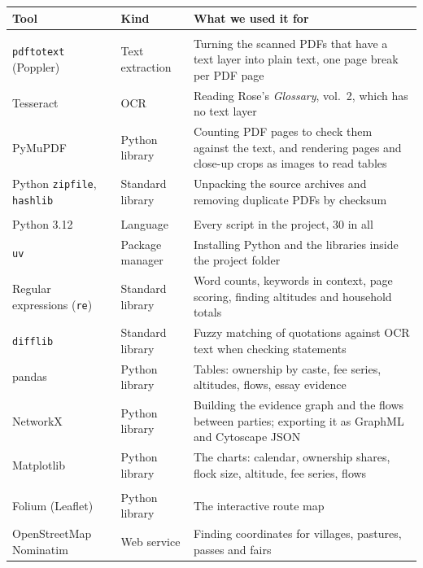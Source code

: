 \documentclass[10pt,a4paper,twocolumn]{article}
\renewcommand{\arraystretch}{1.18}
\begin{document}
{\small
\renewcommand{\arraystretch}{1.22}
\begin{tabularx}{\textwidth}{@{}>{\raggedright\arraybackslash}p{3.6cm}>{\raggedright\arraybackslash}p{2.8cm}>{\raggedright\arraybackslash}X@{}}
\toprule
\textbf{Tool} & \textbf{Kind} & \textbf{What we used it for}\\
\midrule
\multicolumn{3}{@{}l}{\sffamily\bfseries\color{maroon}Preparing the sources}\\
\texttt{pdftotext} (Poppler) & Text extraction & Turning the scanned PDFs that have a text layer into plain text, one page break per PDF page\\
Tesseract & OCR & Reading Rose's \emph{Glossary}, vol.~2, which has no text layer\\
PyMuPDF & Python library & Counting PDF pages to check them against the text, and rendering pages and close-up crops as images to read tables\\
Python \texttt{zipfile}, \texttt{hashlib} & Standard library & Unpacking the source archives and removing duplicate PDFs by checksum\\
\midrule
\multicolumn{3}{@{}l}{\sffamily\bfseries\color{maroon}Analysis}\\
Python 3.12 & Language & Every script in the project, 30 in all\\
\texttt{uv} & Package manager & Installing Python and the libraries inside the project folder\\
Regular expressions (\texttt{re}) & Standard library & Word counts, keywords in context, page scoring, finding altitudes and household totals\\
\texttt{difflib} & Standard library & Fuzzy matching of quotations against OCR text when checking statements\\
pandas & Python library & Tables: ownership by caste, fee series, altitudes, flows, essay evidence\\
NetworkX & Python library & Building the evidence graph and the flows between parties; exporting it as GraphML and Cytoscape JSON\\
Matplotlib & Python library & The charts: calendar, ownership shares, flock size, altitude, fee series, flows\\
\midrule
\multicolumn{3}{@{}l}{\sffamily\bfseries\color{maroon}Maps and places}\\
Folium (Leaflet) & Python library & The interactive route map\\
OpenStreetMap Nominatim & Web service & Finding coordinates for villages, pastures, passes and fairs\\

\end{tabularx}}
\end{document}
